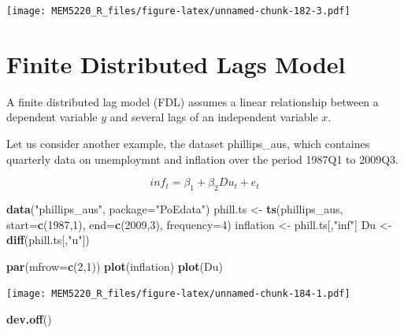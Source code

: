 \documentclass[]{book}
\newenvironment{Shaded}{\begin{snugshade}}{\end{snugshade}}
\newcommand{\DataTypeTok}[1]{\textcolor[rgb]{0.13,0.29,0.53}{#1}}
\newcommand{\DecValTok}[1]{\textcolor[rgb]{0.00,0.00,0.81}{#1}}
\newcommand{\KeywordTok}[1]{\textcolor[rgb]{0.13,0.29,0.53}{\textbf{#1}}}
\newcommand{\NormalTok}[1]{#1}
\newcommand{\StringTok}[1]{\textcolor[rgb]{0.31,0.60,0.02}{#1}}
\begin{document}
\texttt{[image: MEM5220\_R\_files/figure-latex/unnamed-chunk-182-3.pdf]}

\hypertarget{finite-distributed-lags-model}{%
\section{Finite Distributed Lags Model}\label{finite-distributed-lags-model}}

A finite distributed lag model (FDL) assumes a linear relationship between a dependent variable \(y\) and several lags of an independent variable \(x\).

Let us consider another example, the dataset phillips\_aus, which containes quarterly data on unemploymnt and inflation over the period 1987Q1 to 2009Q3.

\[inf_t = \beta_1 + \beta_2 Du_t + e_t\]

\begin{Shaded}
\begin{Highlighting}[]
\KeywordTok{data}\NormalTok{(}\StringTok{"phillips_aus"}\NormalTok{, }\DataTypeTok{package=}\StringTok{"PoEdata"}\NormalTok{)}
\NormalTok{phill.ts <-}\StringTok{ }\KeywordTok{ts}\NormalTok{(phillips_aus, }
               \DataTypeTok{start=}\KeywordTok{c}\NormalTok{(}\DecValTok{1987}\NormalTok{,}\DecValTok{1}\NormalTok{), }
               \DataTypeTok{end=}\KeywordTok{c}\NormalTok{(}\DecValTok{2009}\NormalTok{,}\DecValTok{3}\NormalTok{),}
               \DataTypeTok{frequency=}\DecValTok{4}\NormalTok{)}
\NormalTok{inflation <-}\StringTok{ }\NormalTok{phill.ts[,}\StringTok{"inf"}\NormalTok{]}
\NormalTok{Du <-}\StringTok{ }\KeywordTok{diff}\NormalTok{(phill.ts[,}\StringTok{"u"}\NormalTok{])}
\end{Highlighting}
\end{Shaded}

\begin{Shaded}
\begin{Highlighting}[]
\KeywordTok{par}\NormalTok{(}\DataTypeTok{mfrow=}\KeywordTok{c}\NormalTok{(}\DecValTok{2}\NormalTok{,}\DecValTok{1}\NormalTok{))}
\KeywordTok{plot}\NormalTok{(inflation)}
\KeywordTok{plot}\NormalTok{(Du)}
\end{Highlighting}
\end{Shaded}

\texttt{[image: MEM5220\_R\_files/figure-latex/unnamed-chunk-184-1.pdf]}

\begin{Shaded}
\begin{Highlighting}[]
\KeywordTok{dev.off}\NormalTok{()}
\end{Highlighting}
\end{Shaded}
\end{document}
